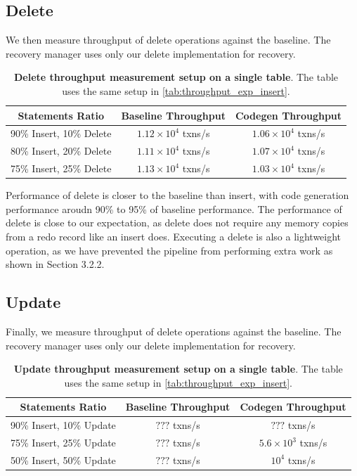 \documentclass[12pt]{cmuthesis}
\begin{document}
\subsection{Delete}
We then measure throughput of delete operations against the baseline. The recovery manager uses only our delete implementation for recovery.
\begin{table}[H]
\begin{center}
\begin{tabular}{ |c|c|c| } 
 \hline
Statements Ratio & \textbf{Baseline Throughput} & \textbf{Codegen Throughput}\\
 \hline
 90\% Insert, 10\% Delete & $1.12 \times 10^4$ txns/s & $1.06 \times 10^4$ txns/s \\ 
 \hline
 80\% Insert, 20\% Delete & $1.11 \times 10^4$ txns/s & $1.07 \times 10^4$ txns/s\\
  \hline
 75\% Insert, 25\% Delete & $1.13 \times 10^4$ txns/s & $1.03 \times 10^4$ txns/s\\
 \hline
\end{tabular}
\caption{\textbf{Delete throughput measurement setup on a single table}. The table uses the same setup in \ref{tab:throughput_exp_insert}.}
\label{tab:throughput_exp_delete}
\end{center}
\end{table}

Performance of delete is closer to the baseline than insert, with code generation performance aroudn 90\% to 95\% of baseline performance. The performance of delete is close to our expectation, as delete does not require any memory copies from a redo record like an insert does. Executing a delete is also a lightweight operation, as we have prevented the pipeline from performing extra work as shown in Section 3.2.2.

\subsection{Update}
Finally, we measure throughput of delete operations against the baseline. The recovery manager uses only our delete implementation for recovery.
\begin{table}[H]
\begin{center}
\begin{tabular}{ |c|c|c| } 
 \hline
Statements Ratio & \textbf{Baseline Throughput} & \textbf{Codegen Throughput}\\ 
 \hline
 90\% Insert, 10\% Update & $???$ txns/s & $???$ txns/s\\
  \hline
 75\% Insert, 25\% Update & $???$ txns/s & $5.6 \times 10^3$ txns/s\\
 \hline
 50\% Insert, 50\% Update & $???$ txns/s & $10^4$ txns/s \\ 
 \hline
\end{tabular}
\caption{\textbf{Update throughput measurement setup on a single table}. The table uses the same setup in \ref{tab:throughput_exp_insert}.}
\label{tab:throughput_exp_update}
\end{center}
\end{table}
\end{document}
